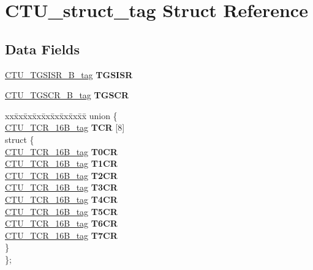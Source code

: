 \hypertarget{structCTU__struct__tag}{}\section{C\+T\+U\+\_\+struct\+\_\+tag Struct Reference}
\label{structCTU__struct__tag}
\subsection*{Data Fields}
\begin{DoxyCompactItemize}
\item 
\mbox{\label{structCTU__struct__tag_ad32e105158fc4f6371934f3bd09efc21}} 
\mbox{\hyperlink{unionCTU__TGSISR__32B__tag}{C\+T\+U\+\_\+\+T\+G\+S\+I\+S\+R\+\_\+B\+\_\+tag}} {\bfseries T\+G\+S\+I\+SR}
\item 
\mbox{\label{structCTU__struct__tag_ab181875caba894358bb9b871a5535abf}} 
\mbox{\hyperlink{unionCTU__TGSCR__16B__tag}{C\+T\+U\+\_\+\+T\+G\+S\+C\+R\+\_\+B\+\_\+tag}} {\bfseries T\+G\+S\+CR}
\item 
\mbox{\label{structCTU__struct__tag_a5f37d278deaa41b91d7468e1b31c37af}} 
\begin{tabbing}
xx\=xx\=xx\=xx\=xx\=xx\=xx\=xx\=xx\=\kill
union \{\\
\>\mbox{\hyperlink{unionCTU__TCR__16B__tag}{CTU\_TCR\_16B\_tag}} {\bfseries TCR} \mbox{[}8\mbox{]}\\
\mbox{\label{unionCTU__struct__tag_1_1_0D1892_a5df3394e5dbc2260ed6ee598ffe85b67}} 
\>struct \{\\
\>\>\mbox{\hyperlink{unionCTU__TCR__16B__tag}{CTU\_TCR\_16B\_tag}} {\bfseries T0CR}\\
\>\>\mbox{\hyperlink{unionCTU__TCR__16B__tag}{CTU\_TCR\_16B\_tag}} {\bfseries T1CR}\\
\>\>\mbox{\hyperlink{unionCTU__TCR__16B__tag}{CTU\_TCR\_16B\_tag}} {\bfseries T2CR}\\
\>\>\mbox{\hyperlink{unionCTU__TCR__16B__tag}{CTU\_TCR\_16B\_tag}} {\bfseries T3CR}\\
\>\>\mbox{\hyperlink{unionCTU__TCR__16B__tag}{CTU\_TCR\_16B\_tag}} {\bfseries T4CR}\\
\>\>\mbox{\hyperlink{unionCTU__TCR__16B__tag}{CTU\_TCR\_16B\_tag}} {\bfseries T5CR}\\
\>\>\mbox{\hyperlink{unionCTU__TCR__16B__tag}{CTU\_TCR\_16B\_tag}} {\bfseries T6CR}\\
\>\>\mbox{\hyperlink{unionCTU__TCR__16B__tag}{CTU\_TCR\_16B\_tag}} {\bfseries T7CR}\\
\>\} \\
\}; \\


\end{tabbing}
\end{DoxyCompactItemize}
